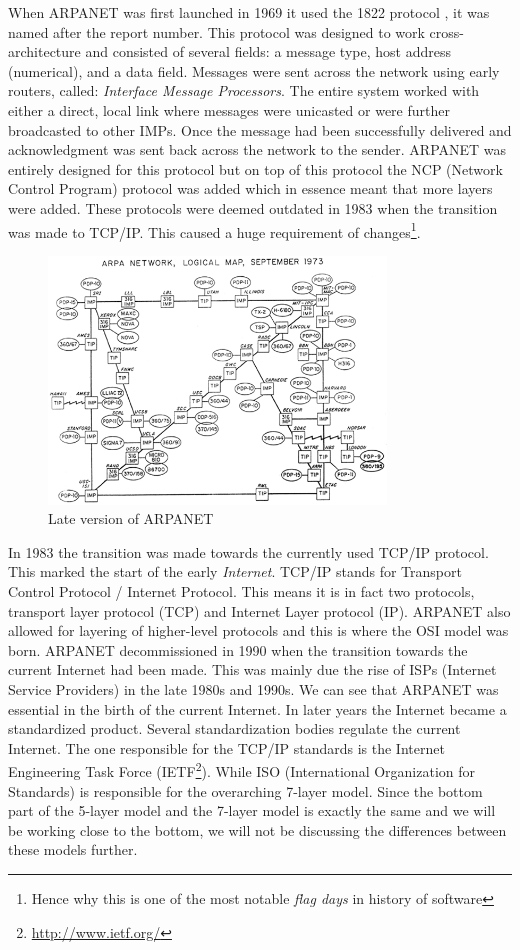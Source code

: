 \npar
When ARPANET was first launched in 1969 it used the 1822 protocol \citep{frankheart1970}, it was named after the report number. This protocol was designed to work cross-architecture and consisted of several fields: a message type, host address (numerical), and a data field. Messages were sent across the network using early routers, called: \emph{Interface Message Processors}. The entire system worked with either a direct, local link where messages were unicasted or were further broadcasted to other IMPs. Once the message had been successfully delivered and acknowledgment was sent back across the network to the sender. ARPANET was entirely designed for this protocol but on top of this protocol the NCP (Network Control Program) protocol was added which in essence meant that more layers were added. These protocols were deemed outdated in 1983 when the transition was made to TCP/IP. This caused a huge requirement of changes\footnote{Hence why this is one of the most notable \emph{flag days} in history of software}.
\npar
\begin{figure}[H]
    \centering
    \includegraphics[width=0.8\textwidth]{figures/latearpanet}
    \caption{Late version of ARPANET \citep{website:computerhistory}} 
    \label{fig:latearpanet}
\end{figure}
\npar
In 1983 the transition was made towards the currently used TCP/IP protocol. This marked the start of the early \emph{Internet}. TCP/IP stands for Transport Control Protocol / Internet Protocol. This means it is in fact two protocols, transport layer protocol (TCP) and Internet Layer protocol (IP). ARPANET also allowed for layering of higher-level protocols and this is where the OSI model was born. ARPANET decommissioned in 1990 when the transition towards the current Internet had been made. This was mainly due the rise of ISPs (Internet Service Providers) in the late 1980s and 1990s. We can see that ARPANET was essential in the birth of the current Internet. 
\npar
In later years the Internet became a standardized product. Several standardization bodies regulate the current Internet. The one responsible for the TCP/IP standards is the Internet Engineering Task Force (IETF\footnote{\url{http://www.ietf.org/}}). While ISO (International Organization for Standards) is responsible for the overarching 7-layer model. Since the bottom part of the 5-layer model and the 7-layer model is exactly the same and we will be working close to the bottom, we will not be discussing the differences between these models further.


